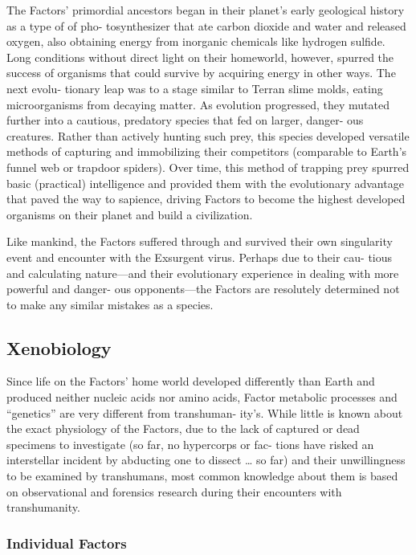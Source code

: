 The Factors' primordial ancestors began in their 
planet's early geological history as a type of of pho-
tosynthesizer that ate carbon dioxide and water and 
released oxygen, also obtaining energy from inorganic 
chemicals like hydrogen sulfide. Long conditions 
without direct light on their homeworld, however, 
spurred the success of organisms that could survive 
by acquiring energy in other ways. The next evolu-
tionary leap was to a stage similar to Terran slime 
molds, eating microorganisms from decaying matter. 
As evolution progressed, they mutated further into a 
cautious, predatory species that fed on larger, danger-
ous creatures. Rather than actively hunting such prey, 
this species developed versatile methods of capturing 
and immobilizing their competitors (comparable to 
Earth's funnel web or trapdoor spiders). Over time, 
this method of trapping prey spurred basic (practical) 
intelligence and provided them with the evolutionary 
advantage that paved the way to sapience, driving 
Factors to become the highest developed organisms 
on their planet and build a civilization. 

Like mankind, the Factors suffered through and 
survived their own singularity event and encounter 
with the Exsurgent virus. Perhaps due to their cau-
tious and calculating nature—and their evolutionary 
experience in dealing with more powerful and danger-
ous opponents—the Factors are resolutely determined 
not to make any similar mistakes as a species. 

\subsection{Xenobiology }

Since life on the Factors' home world developed 
differently than Earth and produced neither nucleic 
acids nor amino acids, Factor metabolic processes 
and ``genetics'' are very different from transhuman-
ity's. While little is known about the exact physiology 
of the Factors, due to the lack of captured or dead 
specimens to investigate (so far, no hypercorps or fac-
tions have risked an interstellar incident by abducting 
one to dissect … so far) and their unwillingness to be 
examined by transhumans, most common knowledge 
about them is based on observational and forensics 
research during their encounters with transhumanity. 

\subsubsection{Individual Factors}

